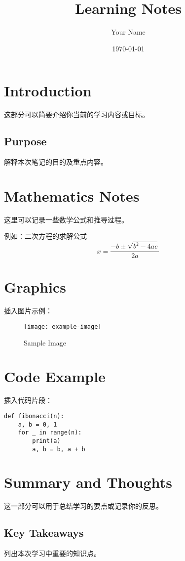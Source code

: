 \documentclass[a4paper,12pt]{article}
\title{Learning Notes}
\author{Your Name}
\date{\today}
\begin{document}
\maketitle

\tableofcontents   %
\newpage

\section{Introduction}
这部分可以简要介绍你当前的学习内容或目标。

\subsection{Purpose}
解释本次笔记的目的及重点内容。

\section{Mathematics Notes}
这里可以记录一些数学公式和推导过程。

例如：二次方程的求解公式
\begin{equation}
x = \frac{-b \pm \sqrt{b^2 - 4ac}}{2a}
\end{equation}

\section{Graphics}
插入图片示例：
\begin{figure}[h]
\centering
\texttt{[image: example-image]} %
\caption{Sample Image}
\end{figure}

\section{Code Example}
插入代码片段：
\begin{lstlisting}
def fibonacci(n):
    a, b = 0, 1
    for _ in range(n):
        print(a)
        a, b = b, a + b
\end{lstlisting}

\section{Summary and Thoughts}
这一部分可以用于总结学习的要点或记录你的反思。

\subsection{Key Takeaways}
列出本次学习中重要的知识点。
\end{document}
